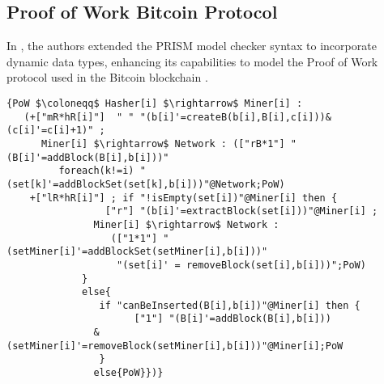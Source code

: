 \subsection{Proof of Work Bitcoin Protocol}
\begin{comment}
\begin{wrapfigure}[11]{r}{4cm}
	\texttt{[image: bitcoin.pdf]}	
\end{wrapfigure} 
\end{comment}
In \cite{DBLP:journals/concurrency/BistarelliNGLMV23}, the authors extended the PRISM model checker syntax to incorporate dynamic data types, enhancing its capabilities to model the Proof of Work protocol used in the Bitcoin blockchain \cite{bitcoin}. 

\begin{lstlisting}[style=chor-color,breaklines=true, postbreak=\mbox{\textcolor{red}{$\hookrightarrow$}\space},caption={Choreography for the Proof of Work Bitcoin Protocol},captionpos=b,label={ex3-code}]
   {PoW $\coloneqq$ Hasher[i] $\rightarrow$ Miner[i] :
   (+["mR*hR[i]"]  " " "(b[i]'=createB(b[i],B[i],c[i]))&(c[i]'=c[i]+1)" ; 
      Miner[i] $\rightarrow$ Network : (["rB*1"] "(B[i]'=addBlock(B[i],b[i]))"   
         foreach(k!=i) "(set[k]'=addBlockSet(set[k],b[i]))"@Network;PoW)
    +["lR*hR[i]"] ; if "!isEmpty(set[i])"@Miner[i] then { 
                 ["r"] "(b[i]'=extractBlock(set[i]))"@Miner[i] ;  
               Miner[i] $\rightarrow$ Network : 
                  (["1*1"] "(setMiner[i]'=addBlockSet(setMiner[i],b[i]))"
                   "(set[i]' = removeBlock(set[i],b[i]))";PoW) 
             }
             else{
                if "canBeInserted(B[i],b[i])"@Miner[i] then { 
                      ["1"] "(B[i]'=addBlock(B[i],b[i]))
               &(setMiner[i]'=removeBlock(setMiner[i],b[i]))"@Miner[i];PoW 
                }
               else{PoW}})} 
   \end{lstlisting}
   \vspace{-0.15cm}

